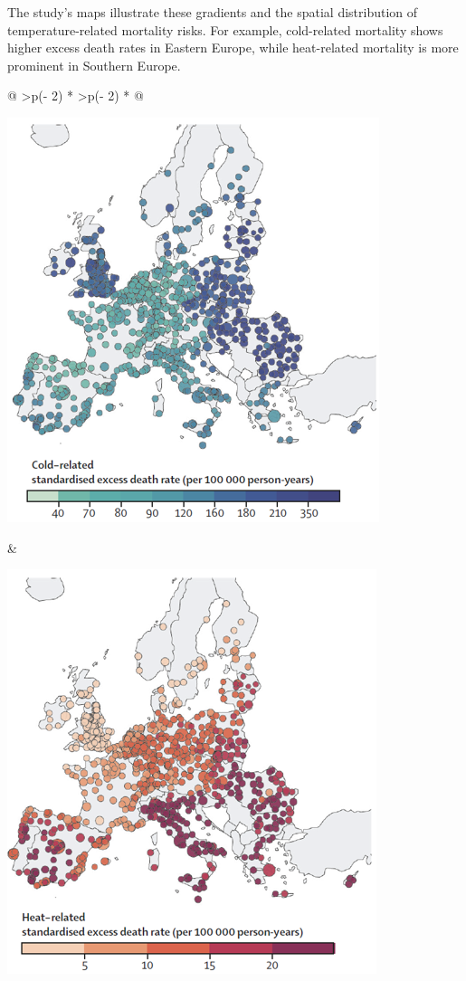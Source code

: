 \documentclass[
]{krantz}
\begin{document}
The study's maps illustrate these gradients and the spatial distribution of temperature-related mortality risks. For example, cold-related mortality shows higher excess death rates in Eastern Europe, while heat-related mortality is more prominent in Southern Europe.

\begin{longtable}[]{@{}
  >{\centering\arraybackslash}p{(\columnwidth - 2\tabcolsep) * }
  >{\centering\arraybackslash}p{(\columnwidth - 2\tabcolsep) * }@{}}
\toprule\noalign{}
\begin{minipage}[b]{\linewidth}\centering
\includegraphics{work/09-epidemiologic/figures/Bild7.png}
\end{minipage} & \begin{minipage}[b]{\linewidth}\centering
\includegraphics{work/09-epidemiologic/figures/Bild8.png}

\end{minipage}
\end{longtable}
\end{document}
